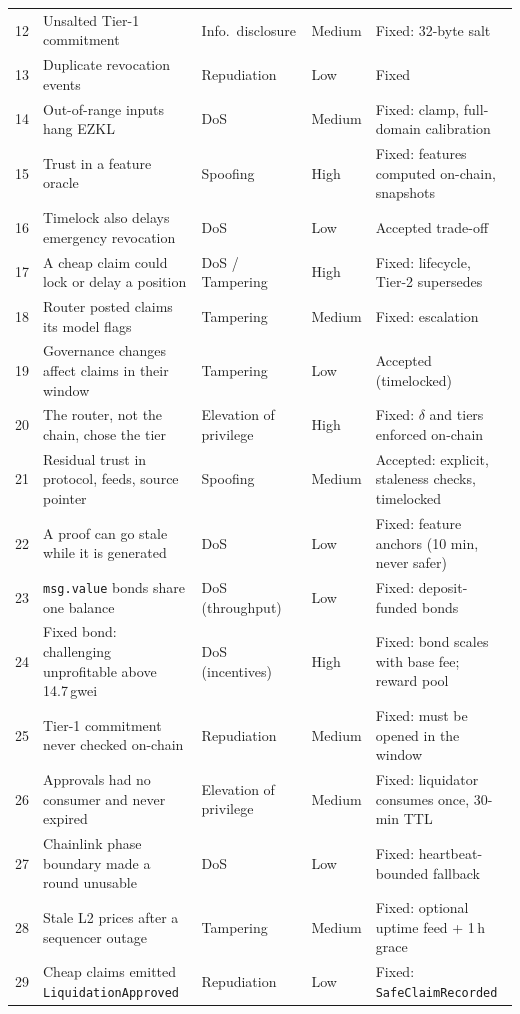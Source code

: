 \documentclass[sigconf,nonacm]{acmart}
\newcommand{\code}[1]{\texttt{\smaller #1}}
\begin{document}
{\begin{center}
\begin{tabularx}{\textwidth}{@{}rLllL@{}}
    12 & Unsalted Tier-1 commitment & Info.\ disclosure & Medium & Fixed: 32-byte salt \\
    13 & Duplicate revocation events & Repudiation & Low & Fixed \\
    14 & Out-of-range inputs hang EZKL & DoS & Medium & Fixed: clamp, full-domain calibration \\
    15 & Trust in a feature oracle & Spoofing & High & Fixed: features computed on-chain, snapshots \\
    16 & Timelock also delays emergency revocation & DoS & Low & Accepted trade-off \\
    17 & A cheap claim could lock or delay a position & DoS / Tampering & High & Fixed: lifecycle, Tier-2 supersedes \\
    18 & Router posted claims its model flags & Tampering & Medium & Fixed: escalation \\
    19 & Governance changes affect claims in their window & Tampering & Low & Accepted (timelocked) \\
    20 & The router, not the chain, chose the tier & Elevation of privilege & High & Fixed: $\delta$ and tiers enforced on-chain \\
    21 & Residual trust in protocol, feeds, source pointer & Spoofing & Medium & Accepted: explicit, staleness checks, timelocked \\
    22 & A proof can go stale while it is generated & DoS & Low & Fixed: feature anchors (10 min, never safer) \\
    23 & \code{msg.value} bonds share one balance & DoS (throughput) & Low & Fixed: deposit-funded bonds \\
    24 & Fixed bond: challenging unprofitable above 14.7\,gwei & DoS (incentives) & High & Fixed: bond scales with base fee; reward pool \\
    25 & Tier-1 commitment never checked on-chain & Repudiation & Medium & Fixed: must be opened in the window \\
    26 & Approvals had no consumer and never expired & Elevation of privilege & Medium & Fixed: liquidator consumes once, 30-min TTL \\
    27 & Chainlink phase boundary made a round unusable & DoS & Low & Fixed: heartbeat-bounded fallback \\
    28 & Stale L2 prices after a sequencer outage & Tampering & Medium & Fixed: optional uptime feed + 1\,h grace \\
    29 & Cheap claims emitted \code{LiquidationApproved} & Repudiation & Low & Fixed: \code{SafeClaimRecorded} \\

\end{tabularx}
\end{center}}
\end{document}
